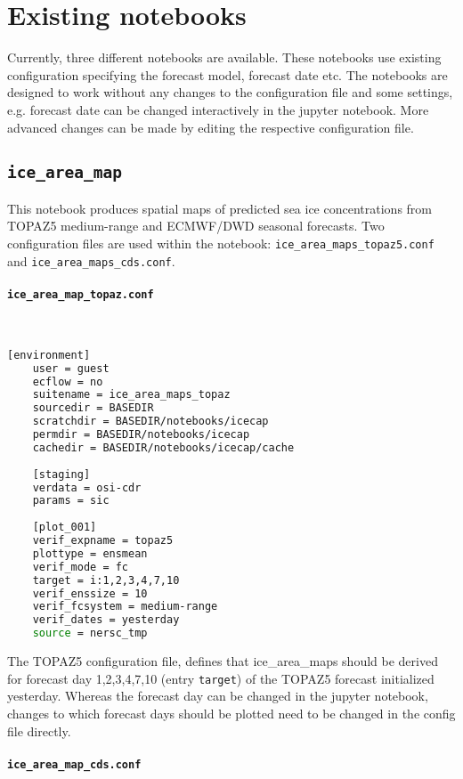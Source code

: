 \documentclass[DIV=10, parskip=full]{scrreprt}
\newcommand{\notimplement}[1]{#1}
\begin{document}
\section{Existing notebooks}
\notimplement{Currently, three different notebooks are available. These notebooks use existing configuration specifying the forecast model, forecast date etc. The notebooks are designed to work without any changes to the configuration file and some settings, e.g. forecast date can be changed interactively in the jupyter notebook. More advanced changes can be made by editing the respective configuration file.   }

\subsection{\texttt{ice\_area\_map}}
This notebook produces spatial maps of predicted sea ice concentrations from TOPAZ5 medium-range and ECMWF/DWD seasonal forecasts. Two configuration files are used within the notebook: \texttt{ice\_area\_maps\_topaz5.conf} and \texttt{ice\_area\_maps\_cds.conf}.

\paragraph{\texttt{ice\_area\_map\_topaz.conf}}\mbox{}\\
\begin{lstlisting}[language=bash]
	[environment]
	user = guest
	ecflow = no
	suitename = ice_area_maps_topaz
	sourcedir = BASEDIR
	scratchdir = BASEDIR/notebooks/icecap
	permdir = BASEDIR/notebooks/icecap
	cachedir = BASEDIR/notebooks/icecap/cache
	
	[staging]
	verdata = osi-cdr
	params = sic
	
	[plot_001]
	verif_expname = topaz5
	plottype = ensmean
	verif_mode = fc
	target = i:1,2,3,4,7,10
	verif_enssize = 10
	verif_fcsystem = medium-range
	verif_dates = yesterday
	source = nersc_tmp
\end{lstlisting}

The TOPAZ5 configuration file, defines that ice\_area\_maps should be derived for forecast day 1,2,3,4,7,10 (entry \texttt{target}) of the TOPAZ5 forecast initialized yesterday. Whereas the forecast day can be changed in the jupyter notebook, changes to which forecast days should be plotted need to be changed in the config file directly.

\paragraph{\texttt{ice\_area\_map\_cds.conf}}\mbox{}\\
\end{document}
